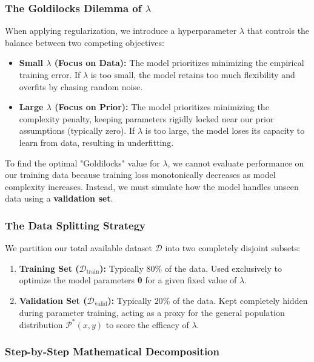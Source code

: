 \documentclass{article}
\begin{document}
\subsubsection{The Goldilocks Dilemma of $\lambda$}
When applying regularization, we introduce a hyperparameter $\lambda$ that controls the balance between two competing objectives:
\begin{itemize}
    \item \textbf{Small $\lambda$ (Focus on Data):} The model prioritizes minimizing the empirical training error. If $\lambda$ is too small, the model retains too much flexibility and overfits by chasing random noise.
    \item \textbf{Large $\lambda$ (Focus on Prior):} The model prioritizes minimizing the complexity penalty, keeping parameters rigidly locked near our prior assumptions (typically zero). If $\lambda$ is too large, the model loses its capacity to learn from data, resulting in underfitting.
\end{itemize}

To find the optimal "Goldilocks" value for $\lambda$, we cannot evaluate performance on our training data because training loss monotonically decreases as model complexity increases. Instead, we must simulate how the model handles unseen data using a \textbf{validation set}.

\subsubsection{The Data Splitting Strategy}
We partition our total available dataset $\mathcal{D}$ into two completely disjoint subsets:
\begin{enumerate}
    \item \textbf{Training Set ($\mathcal{D}_{\text{train}}$):} Typically $80\%$ of the data. Used exclusively to optimize the model parameters $\boldsymbol{\theta}$ for a given fixed value of $\lambda$.
    \item \textbf{Validation Set ($\mathcal{D}_{\text{valid}}$):} Typically $20\%$ of the data. Kept completely hidden during parameter training, acting as a proxy for the general population distribution $\mathcal{P}^*(x,y)$ to score the efficacy of $\lambda$.
\end{enumerate}

\subsubsection{Step-by-Step Mathematical Decomposition}
\end{document}
